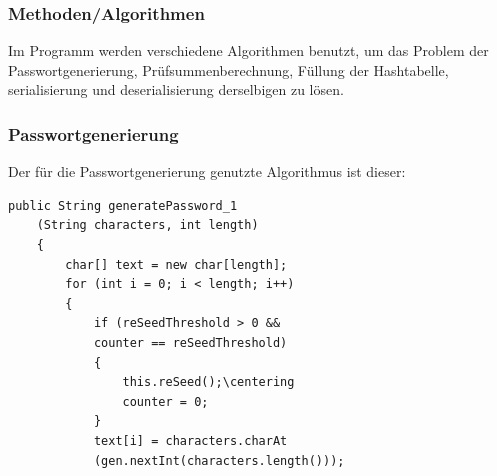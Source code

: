 \documentclass[11pt]{article}
\begin{document}
  \subsubsection{Methoden/Algorithmen}
  Im Programm werden verschiedene Algorithmen benutzt, um das Problem der Passwortgenerierung, Prüfsummenberechnung, Füllung der Hashtabelle, serialisierung und deserialisierung derselbigen zu lösen.
  \newline
  \pagebreak
  \begin{samepage}
  \subsubsection{Passwortgenerierung}
  Der für die Passwortgenerierung genutzte Algorithmus ist dieser: 
  \begin{lstlisting}[caption=Algorithmus zur Passwortgenerierung, label=lst:makePassword_1]
    public String generatePassword_1
    (String characters, int length) 
    {
        char[] text = new char[length];
        for (int i = 0; i < length; i++) 
        {
            if (reSeedThreshold > 0 && 
            counter == reSeedThreshold) 
            {
                this.reSeed();\centering
                counter = 0;
            }
            text[i] = characters.charAt
            (gen.nextInt(characters.length()));
            

\end{lstlisting}
\end{samepage}
\end{document}
